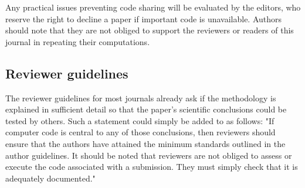 Any practical issues preventing code sharing will be evaluated by the editors, who reserve the right to decline a paper if important code is unavailable. Authors should note that they are not obliged to support the reviewers or readers of this journal in repeating their computations.

\subsection{Reviewer guidelines}

The reviewer guidelines for most journals already ask if the methodology is explained in sufficient detail so that the paper's scientific conclusions could be tested by others. Such a statement could simply be added to as follows: "If computer code is central to any of those conclusions, then reviewers should ensure that the authors have attained the minimum standards outlined in the author guidelines. It should be noted that reviewers are not obliged to assess or execute the code associated with a submission. They must simply check that it is adequately documented."   